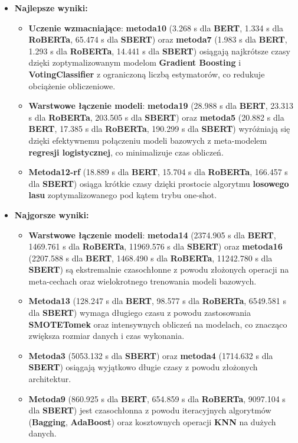 \begin{itemize}
	\item \textbf{Najlepsze wyniki:}
	      \begin{itemize}
		      \item \textbf{Uczenie wzmacniające}: \textbf{metoda10} (3.268 s dla \textbf{BERT}, 1.334 s dla \textbf{RoBERTa}, 65.474 s dla \textbf{SBERT}) oraz \textbf{metoda7} (1.983 s dla \textbf{BERT}, 1.293 s dla \textbf{RoBERTa}, 14.441 s dla \textbf{SBERT}) osiągają najkrótsze czasy dzięki zoptymalizowanym modelom \textbf{Gradient Boosting} i \textbf{VotingClassifier} z ograniczoną liczbą estymatorów, co redukuje obciążenie obliczeniowe.
		      \item \textbf{Warstwowe łączenie modeli}: \textbf{metoda19} (28.988 s dla \textbf{BERT}, 23.313 s dla \textbf{RoBERTa}, 203.505 s dla \textbf{SBERT}) oraz \textbf{metoda5} (20.882 s dla \textbf{BERT}, 17.385 s dla \textbf{RoBERTa}, 190.299 s dla \textbf{SBERT}) wyróżniają się dzięki efektywnemu połączeniu modeli bazowych z meta-modelem \textbf{regresji logistycznej}, co minimalizuje czas obliczeń.
		      \item \textbf{Metoda12-rf} (18.889 s dla \textbf{BERT}, 15.704 s dla \textbf{RoBERTa}, 166.457 s dla \textbf{SBERT}) osiąga krótkie czasy dzięki prostocie algorytmu \textbf{losowego lasu} zoptymalizowanego pod kątem trybu one-shot.
	      \end{itemize}
	\item \textbf{Najgorsze wyniki:}
	      \begin{itemize}
		      \item \textbf{Warstwowe łączenie modeli}: \textbf{metoda14} (2374.905 s dla \textbf{BERT}, 1469.761 s dla \textbf{RoBERTa}, 11969.576 s dla \textbf{SBERT}) oraz \textbf{metoda16} (2207.588 s dla \textbf{BERT}, 1468.490 s dla \textbf{RoBERTa}, 11242.780 s dla \textbf{SBERT}) są ekstremalnie czasochłonne z powodu złożonych operacji na meta-cechach oraz wielokrotnego trenowania modeli bazowych.
		      \item \textbf{Metoda13} (128.247 s dla \textbf{BERT}, 98.577 s dla \textbf{RoBERTa}, 6549.581 s dla \textbf{SBERT}) wymaga długiego czasu z powodu zastosowania \textbf{SMOTETomek} oraz intensywnych obliczeń na modelach, co znacząco zwiększa rozmiar danych i czas wykonania.
		      \item \textbf{Metoda3} (5053.132 s dla \textbf{SBERT}) oraz \textbf{metoda4} (1714.632 s dla \textbf{SBERT}) osiągają wyjątkowo długie czasy z powodu złożonych architektur.
		      \item \textbf{Metoda9} (860.925 s dla \textbf{BERT}, 654.859 s dla \textbf{RoBERTa}, 9097.104 s dla \textbf{SBERT}) jest czasochłonna z powodu iteracyjnych algorytmów (\textbf{Bagging}, \textbf{AdaBoost}) oraz kosztownych operacji \textbf{KNN} na dużych danych.
	      \end{itemize}
\end{itemize}


